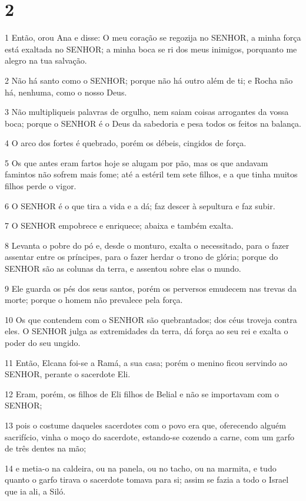 \chapter{2}

\par 1 Então, orou Ana e disse: O meu coração se regozija no SENHOR, a minha força está exaltada no SENHOR; a minha boca se ri dos meus inimigos, porquanto me alegro na tua salvação.
\par 2 Não há santo como o SENHOR; porque não há outro além de ti; e Rocha não há, nenhuma, como o nosso Deus.
\par 3 Não multipliqueis palavras de orgulho, nem saiam coisas arrogantes da vossa boca; porque o SENHOR é o Deus da sabedoria e pesa todos os feitos na balança.
\par 4 O arco dos fortes é quebrado, porém os débeis, cingidos de força.
\par 5 Os que antes eram fartos hoje se alugam por pão, mas os que andavam famintos não sofrem mais fome; até a estéril tem sete filhos, e a que tinha muitos filhos perde o vigor.
\par 6 O SENHOR é o que tira a vida e a dá; faz descer à sepultura e faz subir.
\par 7 O SENHOR empobrece e enriquece; abaixa e também exalta.
\par 8 Levanta o pobre do pó e, desde o monturo, exalta o necessitado, para o fazer assentar entre os príncipes, para o fazer herdar o trono de glória; porque do SENHOR são as colunas da terra, e assentou sobre elas o mundo.
\par 9 Ele guarda os pés dos seus santos, porém os perversos emudecem nas trevas da morte; porque o homem não prevalece pela força.
\par 10 Os que contendem com o SENHOR são quebrantados; dos céus troveja contra eles. O SENHOR julga as extremidades da terra, dá força ao seu rei e exalta o poder do seu ungido.
\par 11 Então, Elcana foi-se a Ramá, a sua casa; porém o menino ficou servindo ao SENHOR, perante o sacerdote Eli.
\par 12 Eram, porém, os filhos de Eli filhos de Belial e não se importavam com o SENHOR;
\par 13 pois o costume daqueles sacerdotes com o povo era que, oferecendo alguém sacrifício, vinha o moço do sacerdote, estando-se cozendo a carne, com um garfo de três dentes na mão;
\par 14 e metia-o na caldeira, ou na panela, ou no tacho, ou na marmita, e tudo quanto o garfo tirava o sacerdote tomava para si; assim se fazia a todo o Israel que ia ali, a Siló.
